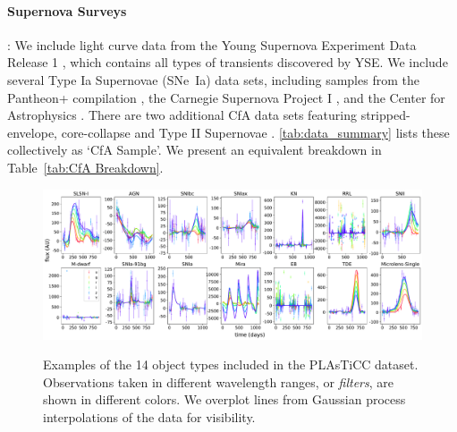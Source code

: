 \paragraph{Supernova Surveys}:
We include light curve data from the Young Supernova Experiment Data Release 1 \citep[YSE DR1; ][]{YSE_DR1_2023}, which contains all types of transients discovered by YSE.
We include several Type Ia Supernovae (SNe~Ia) data sets, including samples from the Pantheon+ compilation \citep{pantheon+, foundation2018,foundation2019, brout2019, scolnic2018, guy2010, brown2014}, the Carnegie Supernova Project I \citep[CSP-I; ][]{CSP-I_2010, CSP-I_2011, CSP-I_2017}, and the Center for Astrophysics \citep[CfA; ][]{CfA3, CfA4}. There are two additional CfA data sets featuring stripped-envelope, core-collapse and Type II Supernovae \citep{CfA-SECCSN, CfA-SNeII}. \autoref{tab:data_summary} lists these collectively as `CfA Sample'. We present an equivalent breakdown in Table~\ref{tab:CfA Breakdown}.
%
\begin{table}[b]
    \begin{threeparttable}
    \centering
    \end{threeparttable}
    \caption{Breakdown of the CfA Samples following the format of \autoref{tab:data_summary}.}
    \label{tab:CfA Breakdown}
\end{table}

\begin{figure}
    \centering
    \caption{Examples of the 14 object types included in the PLAsTiCC dataset. Observations taken in different wavelength ranges, or \textit{filters}, are shown in different colors. We overplot lines from Gaussian process interpolations of the data for visibility.}
    \includegraphics[scale=0.3]{paper/figures/plasticc.pdf}
    \label{fig:plasticc-appendix}
\end{figure}

